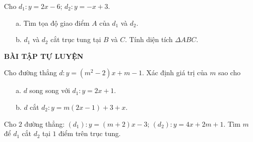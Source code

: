 \begin{vd}%
	Cho $d_1: y=2x-6$; $d_2:y=-x+3$.
	\begin{itemize}
		\item [a.] Tìm tọa độ giao điểm $A$ của $d_1$ và $d_2$.
		\item [b.] $d_1$ và $d_2$ cắt trục tung tại $B$ và $C$. Tính diện tích $\Delta ABC$.
	\end{itemize}
\end{vd}
\begin{center}
	\textbf{BÀI TẬP TỰ LUYỆN}
\end{center}

\begin{bt}%
	Cho đường thẳng $d: y =(m^2-2)x+m-1$. Xác định giá trị của $m$ sao cho 
	\begin{itemize}
		\item [a.] $d$ song song với $d_1: y=2x+1$.
		\item [b.] $d$ cắt $d_2: y=m(2x-1)+3+x$.
	\end{itemize}
\end{bt}

\begin{bt}%
	Cho $2$ đường thẳng: $(d_1): y=(m+2)x-3$; $(d_2): y=4x+2m+1$. Tìm $m$ để $d_1$ cắt $d_2$ tại $1$ điểm trên trục tung. 
\end{bt}

